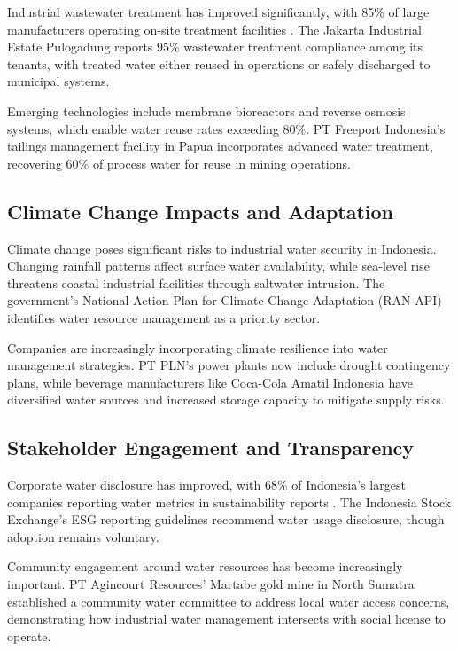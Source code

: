 Industrial wastewater treatment has improved significantly, with 85\% of large manufacturers operating on-site treatment facilities \cite{KLHK2022}. The Jakarta Industrial Estate Pulogadung reports 95\% wastewater treatment compliance among its tenants, with treated water either reused in operations or safely discharged to municipal systems.

Emerging technologies include membrane bioreactors and reverse osmosis systems, which enable water reuse rates exceeding 80\%. PT Freeport Indonesia's tailings management facility in Papua incorporates advanced water treatment, recovering 60\% of process water for reuse in mining operations.

\subsection{Climate Change Impacts and Adaptation}

Climate change poses significant risks to industrial water security in Indonesia. Changing rainfall patterns affect surface water availability, while sea-level rise threatens coastal industrial facilities through saltwater intrusion. The government's National Action Plan for Climate Change Adaptation (RAN-API) identifies water resource management as a priority sector.

Companies are increasingly incorporating climate resilience into water management strategies. PT PLN's power plants now include drought contingency plans, while beverage manufacturers like Coca-Cola Amatil Indonesia have diversified water sources and increased storage capacity to mitigate supply risks.

\subsection{Stakeholder Engagement and Transparency}

Corporate water disclosure has improved, with 68\% of Indonesia's largest companies reporting water metrics in sustainability reports \cite{ACCCSR2022}. The Indonesia Stock Exchange's ESG reporting guidelines recommend water usage disclosure, though adoption remains voluntary.

Community engagement around water resources has become increasingly important. PT Agincourt Resources' Martabe gold mine in North Sumatra established a community water committee to address local water access concerns, demonstrating how industrial water management intersects with social license to operate.

